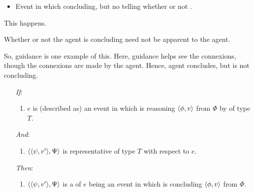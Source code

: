 \begin{note}
  \begin{itemize}
  \item
    Event in which concluding, but no telling whether or not \fc{}.
  \end{itemize}

  This happens.

  Whether or not the agent is concluding need not be apparent to the agent.

  So, guidance is one example of this.
  Here, guidance helps see the connexions, though the connexions are made by the agent.
  Hence, agent concludes, but is not concluding.
\end{note}

\begin{note}
  \begin{proposition}
    \label{prop:hinge}

    \begin{itemize}
    \item[\emph{If}:]
      \begin{enumerate}[label=\alph*., ref=(\alph*), series=propHingeSer]
      \item
        \label{prop:hinge:typical}
        \(e\) is (described as) an event in which \vAgent{} is reasoning \(\langle \phi, v \rangle\) from \(\Phi\) by \sTR{} of type \(T\).
      \end{enumerate}
    \item[\emph{And}:]
      \begin{enumerate}[label=\alph*., ref=(\alph*), resume*=propHingeSer]
      \item
        \label{prop:hinge:rep}
        \(\langle \langle \psi, v' \rangle, \Psi \rangle\) is representative of type \(T\) with respect to \(e\).
      \end{enumerate}
    \item[\emph{Then}:]
      \begin{enumerate}[label=\alph*., ref=(\alph*), resume*=propHingeSer]
      \item
        \label{prop:hinge:requ}
        \(\langle \langle \psi, v' \rangle, \Psi \rangle\) is a \requ{} of \(e\) being an event in which \vAgent{} is concluding \(\langle \phi, v \rangle\) from \(\Phi\).
      \end{enumerate}
    \end{itemize}
  \end{proposition}


\end{note}

